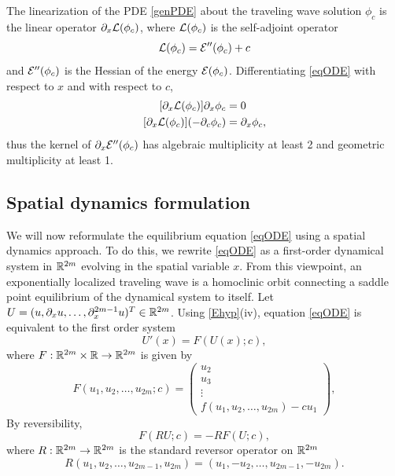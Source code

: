 \documentclass[11pt,reqno]{amsart}
\theoremstyle{plain}
\theoremstyle{definition}
\theoremstyle{remark}
\begin{document}
The linearization of the PDE \cref{genPDE} about the traveling wave solution $\phi_c$ is the linear operator $\partial_x \mathcal{L}(\phi_c)$, where $\mathcal{L}(\phi_c)$ is the self-adjoint operator
\begin{equation}\label{PDElinearization}
\mathcal{L}(\phi_c) = \mathcal{E}''(\phi_c) + c
\end{equation}
and $\mathcal{E}''(\phi_c)$ is the Hessian of the energy $\mathcal{E}(\phi_c)$. Differentiating \cref{eqODE} with respect to $x$ and with respect to $c$,
\begin{equation}\label{Ekernel}
\begin{aligned}
[\partial_x \calL(\phi_c)] \partial_x \phi_c &= 0 \\
[\partial_x \calL(\phi_c)](-\partial_c \phi_c) &= \partial_x \phi_c,
\end{aligned}
\end{equation}
thus the kernel of $\partial_x \mathcal{E}''(\phi_c)$ has algebraic multiplicity at least 2 and geometric multiplicity at least 1.

\subsection{Spatial dynamics formulation}\label{sec:spatdym}

We will now reformulate the equilibrium equation \cref{eqODE} using a spatial dynamics approach. To do this, we rewrite \cref{eqODE} as a first-order dynamical system in $\mathbb{R}^{2m}$ evolving in the spatial variable $x$. From this viewpoint, an exponentially localized traveling wave is a homoclinic orbit connecting a saddle point equilibrium of the dynamical system to itself. Let $U = (u, \partial_x u, \dots, \partial_x^{2m-1} u)^T \in \mathbb{R}^{2m}$. Using \cref{Ehyp}(iv), equation \cref{eqODE} is equivalent to the first order system
\begin{equation}\label{genODE}
U'(x) = F(U(x); c),
\end{equation}
where $F: \mathbb{R}^{2m} \times \mathbb{R} \rightarrow \mathbb{R}^{2m}$ is given by
\begin{equation}\label{defF}
F(u_1, u_2, \dots, u_{2m}; c) = 
\begin{pmatrix}
u_2 \\ u_3 \\ \vdots \\ f(u_1, u_2, \dots, u_{2m}) - c u_1
\end{pmatrix},
\end{equation}
By reversibility,
\begin{equation}\label{genODErev}
F(RU; c) = -RF(U; c),
\end{equation}
where $R:\mathbb{R}^{2m} \rightarrow \mathbb{R}^{2m}$ is the standard reversor operator on $\mathbb{R}^{2m}$
\begin{equation}\label{reverserR2m}
R(u_1, u_2, \dots, u_{2m-1}, u_{2m}) = (u_1, -u_2, \dots, u_{2m-1}, -u_{2m}).
\end{equation}
\end{document}
